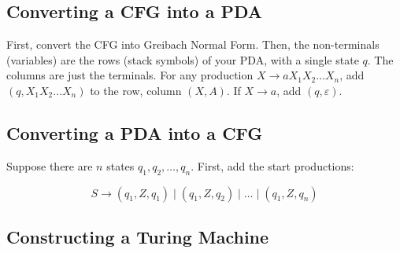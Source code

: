 \subsection{Converting a CFG into a PDA}
First, convert the CFG into Greibach Normal Form. Then, the non-terminals (variables) are the rows (stack symbols) of your PDA, with a single state \(q\). The columns are just the terminals. For any production \(X\to aX_1 X_2\hdots X_n\), add \((q, X_1 X_2\hdots X_n)\) to the row, column \((X, A)\). If \(X\to a\), add \((q, \varepsilon)\). 

\subsection{Converting a PDA into a CFG}
Suppose there are \(n\) states \(q_1, q_2, \hdots, q_n\). First, add the start productions:

\[S\to (q_1, Z, q_1)\mid(q_1, Z, q_2)\mid\hdots\mid(q_1, Z, q_n)\]



\subsection{Constructing a Turing Machine}
